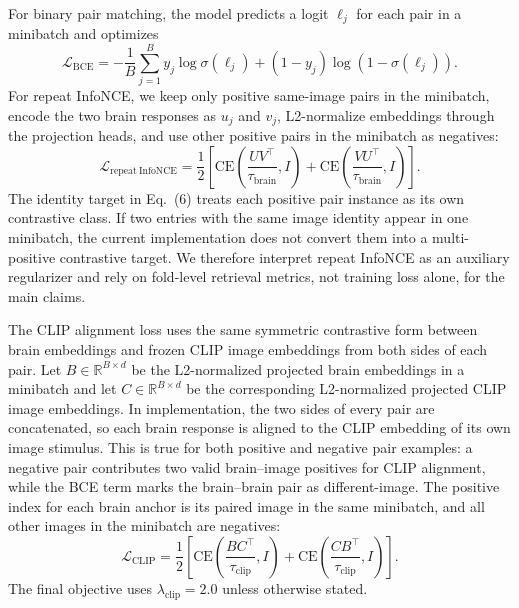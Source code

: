 \documentclass{article}
\begin{document}
For binary pair matching, the model predicts a logit $\ell_j$ for each pair in a minibatch and optimizes
\begin{equation}
  \mathcal{L}_{\mathrm{BCE}}
  = -\frac{1}{B}\sum_{j=1}^{B}
  y_j\log\sigma(\ell_j) + (1-y_j)\log(1-\sigma(\ell_j)).
\end{equation}
For repeat InfoNCE, we keep only positive same-image pairs in the minibatch, encode the two brain responses as $u_j$ and $v_j$, L2-normalize embeddings through the projection heads, and use other positive pairs in the minibatch as negatives:
\begin{equation}
  \mathcal{L}_{\mathrm{repeat\ InfoNCE}}
  = \frac{1}{2}\left[
  \mathrm{CE}\left(\frac{UV^\top}{\tau_{\mathrm{brain}}}, I\right)
  +
  \mathrm{CE}\left(\frac{VU^\top}{\tau_{\mathrm{brain}}}, I\right)
  \right].
\end{equation}
The identity target in Eq.~(6) treats each positive pair instance as its own contrastive class. If two entries with the same image identity appear in one minibatch, the current implementation does not convert them into a multi-positive contrastive target. We therefore interpret repeat InfoNCE as an auxiliary regularizer and rely on fold-level retrieval metrics, not training loss alone, for the main claims.

The CLIP alignment loss uses the same symmetric contrastive form between brain embeddings and frozen CLIP image embeddings from both sides of each pair. Let $B\in\mathbb{R}^{B\times d}$ be the L2-normalized projected brain embeddings in a minibatch and let $C\in\mathbb{R}^{B\times d}$ be the corresponding L2-normalized projected CLIP image embeddings. In implementation, the two sides of every pair are concatenated, so each brain response is aligned to the CLIP embedding of its own image stimulus. This is true for both positive and negative pair examples: a negative pair contributes two valid brain--image positives for CLIP alignment, while the BCE term marks the brain--brain pair as different-image. The positive index for each brain anchor is its paired image in the same minibatch, and all other images in the minibatch are negatives:
\begin{equation}
  \mathcal{L}_{\mathrm{CLIP}}
  = \frac{1}{2}\left[
  \mathrm{CE}\left(\frac{BC^\top}{\tau_{\mathrm{clip}}}, I\right)
  +
  \mathrm{CE}\left(\frac{CB^\top}{\tau_{\mathrm{clip}}}, I\right)
  \right].
\end{equation}
The final objective uses $\lambda_{\mathrm{clip}}=2.0$ unless otherwise stated.
\end{document}
